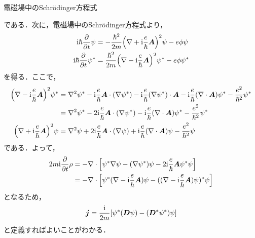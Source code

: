 \documentclass{report}
\begin{document}
\begin{myexc}{電磁場中のSchrödinger方程式}{}
\begin{enumerate}
      である．次に，電磁場中のSchrödinger方程式より，
      \begin{align}
        \mathrm{i}\hbar \frac{\partial}{\partial t} \psi &= -\frac{\hbar^2}{2m}\qty(\nabla + \mathrm{i}\frac{e}{\hbar}\bm{A})^2\psi - e\phi\psi\\
        \mathrm{i}\hbar \frac{\partial}{\partial t} \psi^{*} &= \frac{\hbar^2}{2m}\qty(\nabla - \mathrm{i}\frac{e}{\hbar}\bm{A})^2\psi^{*} - e\phi\psi^{*}
      \end{align}
      を得る．ここで，
      \begin{align}
        \qty(\nabla - \mathrm{i}\frac{e}{\hbar}\bm{A})^2\psi^{*} &= \nabla^2\psi^{*} - \mathrm{i}\frac{e}{\hbar}\bm{A}\cdot(\nabla\psi^{*}) - \mathrm{i}\frac{e}{\hbar}(\nabla\psi^{*})\cdot\bm{A} - \mathrm{i}\frac{e}{\hbar}(\nabla\cdot\bm{A})\psi^{*} - \frac{e^2}{\hbar^2}\psi^{*}\\
        &= \nabla^2\psi^{*} - 2\mathrm{i}\frac{e}{\hbar}\bm{A}\cdot(\nabla\psi^{*}) - \mathrm{i}\frac{e}{\hbar}(\nabla\cdot\bm{A})\psi^{*} - \frac{e^2}{\hbar^2}\psi^{*}\\
        \qty(\nabla + \mathrm{i}\frac{e}{\hbar}\bm{A})^2\psi &=\nabla^2\psi + 2\mathrm{i}\frac{e}{\hbar}\bm{A}\cdot(\nabla\psi) + \mathrm{i}\frac{e}{\hbar}(\nabla\cdot\bm{A})\psi - \frac{e^2}{\hbar^2}\psi
      \end{align}
      である．よって，
      \begin{align}
        2m\mathrm{i}\frac{\partial}{\partial t}\rho &= -\nabla\cdot\qty[\psi^{*}\nabla\psi - (\nabla\psi^{*})\psi - 2\mathrm{i} \frac{e}{\hbar}\bm{A}\psi^{*}\psi]\\
        &= -\nabla\cdot\qty[\psi^{*}(\nabla - \mathrm{i}\frac{e}{\hbar} \bm{A})\psi - ((\nabla - \mathrm{i} \frac{e}{\hbar}\bm{A})\psi)^{*}\psi]
      \end{align}
      となるため，
      \begin{align}
        \bm{j} = \frac{\mathrm{i}}{2m}\qty[\psi^{*}(\bm{D}\psi) - (\bm{D}^{*}\psi^{*})\psi]
      \end{align}
      と定義すればよいことがわかる．
  \end{enumerate}
  \end{myexc}
\end{document}
